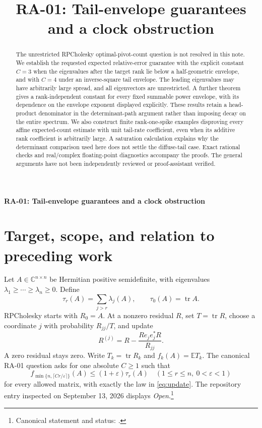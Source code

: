 \documentclass[11pt]{article}
\title{RA-01: Tail-envelope guarantees and a clock obstruction}
\author{}\date{}
\theoremstyle{remark}\newtheorem{remark}[theorem]{Remark}
\DeclareMathOperator{\tr}{tr}
\newcommand{\E}{\mathbb E}
\newcommand{\C}{\mathbb C}
\newcommand{\eps}{\varepsilon}
\begin{document}
\begin{center}
{\Large\bfseries RA-01: Tail-envelope guarantees and a clock obstruction}
\end{center}
\vspace{0.4em}
\begin{abstract}
The unrestricted RPCholesky optimal-pivot-count question is not resolved in this note. We establish the requested expected relative-error guarantee with the explicit constant $C=3$ when the eigenvalues after the target rank lie below a half-geometric envelope, and with $C=4$ under an inverse-square tail envelope. The leading eigenvalues may have arbitrarily large spread, and all eigenvectors are unrestricted. A further theorem gives a rank-independent constant for every fixed summable power envelope, with its dependence on the envelope exponent displayed explicitly. These results retain a head-product denominator in the determinant-path argument rather than imposing decay on the entire spectrum. We also construct finite rank-one-spike examples disproving every affine expected-count estimate with unit tail-rate coefficient, even when its additive rank coefficient is arbitrarily large. A saturation calculation explains why the determinant comparison used here does not settle the diffuse-tail case. Exact rational checks and real/complex floating-point diagnostics accompany the proofs. The general arguments have not been independently reviewed or proof-assistant verified.
\end{abstract}

\section{Target, scope, and relation to preceding work}
Let $A\in\C^{n\times n}$ be Hermitian positive semidefinite, with eigenvalues
$\lambda_1\ge\cdots\ge\lambda_n\ge0$. Define
\[
 \tau_r(A)=\sum_{j>r}\lambda_j(A),\qquad \tau_0(A)=\tr A.
\]
RPCholesky starts with $R_0=A$. At a nonzero residual $R$, set $T=\tr R$, choose a coordinate $j$ with probability $R_{jj}/T$, and update
\begin{equation}
 R^{(j)}=R-\frac{Re_je_j^*R}{R_{jj}}. \label{eq:update}
\end{equation}
A zero residual stays zero. Write $T_k=\tr R_k$ and $f_k(A)=\E T_k$.
The canonical RA-01 question asks for one absolute $C\ge1$ such that
\begin{equation}
 f_{\min\{n,\lceil Cr/\eps\rceil\}}(A)
 \le (1+\eps)\tau_r(A)
 \quad(1\le r\le n,\ 0<\eps<1) \label{eq:target}
\end{equation}
for every allowed matrix, with exactly the law in \eqref{eq:update}. The repository entry inspected on September 13, 2026 displays \emph{Open}.\footnote{Canonical statement and status: \cite{repo}.}
\end{document}
